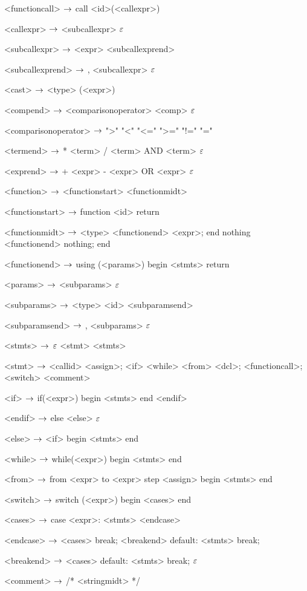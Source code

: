 \begin{grammar}
<functioncall> $\rightarrow$ call <id>(<callexpr>)

<callexpr> $\rightarrow$ <subcallexpr>
\alt $\varepsilon$

<subcallexpr> $\rightarrow$ <expr> <subcallexprend>

<subcallexprend> $\rightarrow$ , <subcallexpr>
\alt $\varepsilon$

<cast> $\rightarrow$ <type> (<expr>)

<compend> $\rightarrow$ <comparisonoperator> <comp>
\alt $\varepsilon$

<comparisonoperator> $\rightarrow$ ">"
				\alt "<"
				\alt "<="
				\alt ">="
				\alt "!="
				\alt "="

<termend> $\rightarrow$ * <term>
\alt / <term>
\alt AND <term>
\alt $\varepsilon$

<exprend> $\rightarrow$ + <expr>
\alt - <expr>
\alt OR <expr>
\alt $\varepsilon$

<function> $\rightarrow$  <functionstart> <functionmidt>

<functionstart> $\rightarrow$ function <id> return

<functionmidt> $\rightarrow$ <type> <functionend> <expr>; end
\alt nothing <functionend> nothing; end

<functionend> $\rightarrow$
using (<params>)
begin
	<stmts>
	return

<params> $\rightarrow$ <subparams>
	\alt $\varepsilon$

<subparams> $\rightarrow$ <type> <id> <subparamsend>

<subparamsend> $\rightarrow$ , <subparams>
\alt $\varepsilon$

<stmts> $\rightarrow$ $\varepsilon$
	\alt <stmt> <stmts>

<stmt> $\rightarrow$ <callid> <assign>;
	\alt <if>
	\alt <while>
	\alt <from>
	\alt <dcl>;
	\alt <functioncall>;
	\alt <switch>
	\alt <comment>
	
<if> $\rightarrow$ if(<expr>)
	begin
		<stmts>
	end
	<endif>

<endif> $\rightarrow$ 
	else <else>
	\alt $\varepsilon$

<else> $\rightarrow$ <if>
	\alt begin
		<stmts>
	end

<while> $\rightarrow$ while(<expr>)
		begin
			<stmts>
		end
		
<from> $\rightarrow$ from <expr> to <expr> step <assign>
	begin
		<stmts>
	end

<switch> $\rightarrow$ switch (<expr>)
		begin
			<cases>
		end

<cases> $\rightarrow$ case <expr>:
			<stmts>
		<endcase>
		
<endcase> $\rightarrow$ <cases>
		\alt break; <breakend>
		\alt default:
			<stmts>
			break;

<breakend> $\rightarrow$ <cases>
\alt default:
<stmts>
break;
\alt $\varepsilon$

<comment> $\rightarrow$ /* <stringmidt> */


\end{grammar}